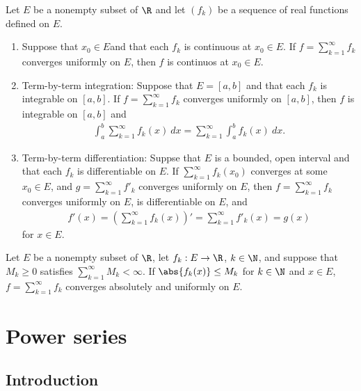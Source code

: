 \documentclass{article}
\begin{document}
\begin{theorem}[Notes 2.4]
    Let $E$ be a nonempty subset of $\R$ and let $(f_k)$ be a sequence of real functions defined on $E$.
    \begin{enumerate}
        \item Suppose that $x_0\in E$and that each $f_k$ is continuous at $x_0\in E$.
              If $f=\sum_{k=1}^\infty f_k$ converges uniformly on $E$, then $f$ is continuos at $x_0\in E$.
        \item Term-by-term integration: Suppose that $E=[a,b]$ and that each $f_k$ is integrable on $[a,b]$.
              If $f=\sum_{k=1}^\infty f_k$ converges uniformly on $[a,b]$, then $f$ is integrable on $[a,b]$
              and \begin{align*}
                  \int_a^b \sum_{k=1}^\infty f_k(x)\:dx = \sum_{k=1}^\infty \int_a^b f_k(x)\:dx.
              \end{align*}
        \item Term-by-term differentiation: Suppse that $E$ is a bounded, open interval and that each
              $f_k$ is differentiable on $E$. If $\sum_{k=1}^\infty f_k(x_0)$ converges at some $x_0\in E$,
              and $g=\sum_{k=1}^\infty f'_k$ converges uniformly on $E$, then $f=\sum_{k=1}^\infty f_k$
              converges uniformly on $E$, is differentiable on $E$, and \begin{align*}
                  f'(x) = \left(\sum_{k=1}^\infty f_k(x)\right)' = \sum_{k=1}^\infty f'_k(x)= g(x)
              \end{align*}
              for $x\in E$.
    \end{enumerate}
\end{theorem}

\begin{theorem}
    Let $E$ be a nonempty subset of $\R$, let $f_k:E\to\R$, $k\in\N$, and suppose that $M_k\geq 0$
    satisfies $\sum_{k=1}^\infty M_k<\infty$. If $\abs{f_k(x)}\leq M_k$ for $k\in\N$ and $x\in E$,
    $f=\sum_{k=1}^\infty f_k$ converges absolutely and uniformly on $E$.
\end{theorem}

\section{Power series}

\subsection{Introduction}
\end{document}
